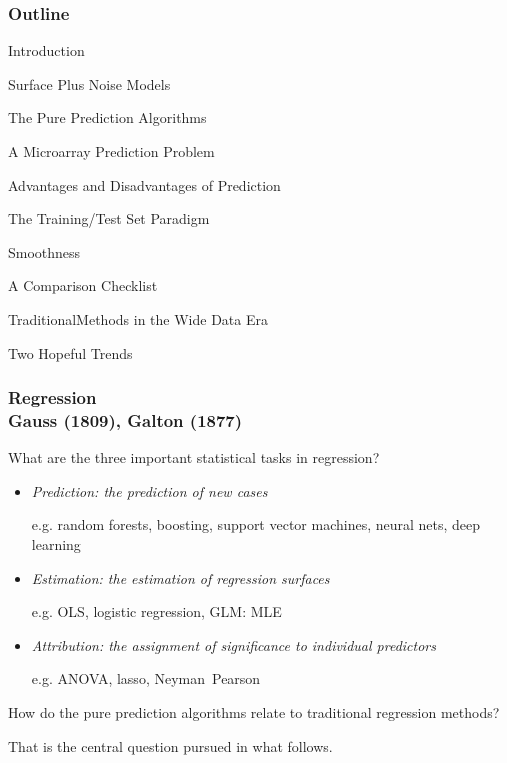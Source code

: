 \begin{frame}[fragile]\frametitle{Outline}

\be
\item Introduction
\item Surface Plus Noise Models
\item The Pure Prediction Algorithms
\item A Microarray Prediction Problem
\item Advantages and Disadvantages of Prediction
\item The Training/Test Set Paradigm
\item Smoothness
\item A Comparison Checklist
\item TraditionalMethods in the Wide Data Era
\item Two Hopeful Trends
\ee

\end{frame}
\begin{frame}[fragile]\frametitle{Regression\\
Gauss (1809), Galton (1877)}

What are the three important statistical tasks in regression?

\end{frame}
\begin{frame}[fragile]
\begin{itemize}
\item \emph{Prediction: the prediction of new cases}

e.g. random forests, boosting, support vector machines,
neural nets, deep learning

\item \emph{Estimation: the
estimation of regression surfaces}

e.g. OLS, logistic regression, GLM: MLE

\item \emph{Attribution: the assignment of significance
to individual predictors}

e.g. ANOVA, lasso, Neyman Pearson
\end{itemize}

\end{frame}
\begin{frame}[fragile]

How do the pure prediction algorithms relate to traditional
regression methods?

That is the central question pursued in
what follows.

\end{frame}
